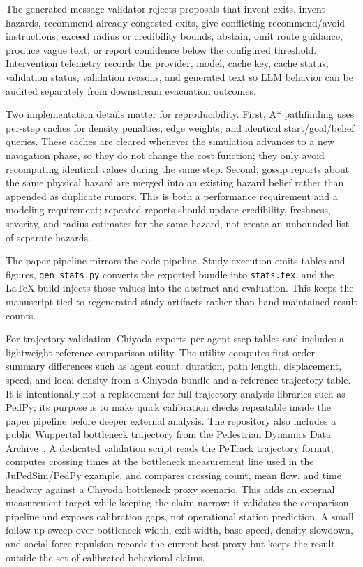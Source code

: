 The generated-message validator rejects proposals that invent exits, invent
hazards, recommend already congested exits, give conflicting recommend/avoid
instructions, exceed radius or credibility bounds, abstain, omit route
guidance, produce vague text, or report confidence below the configured
threshold. Intervention telemetry records the provider, model, cache key,
cache status, validation status, validation reasons, and generated text so
LLM behavior can be audited separately from downstream evacuation outcomes.

Two implementation details matter for reproducibility. First, A* pathfinding
uses per-step caches for density penalties, edge weights, and identical
start/goal/belief queries. These caches are cleared whenever the simulation
advances to a new navigation phase, so they do not change the cost function;
they only avoid recomputing identical values during the same step. Second,
gossip reports about the same physical hazard are merged into an existing
hazard belief rather than appended as duplicate rumors. This is both a
performance requirement and a modeling requirement: repeated reports should
update credibility, freshness, severity, and radius estimates for the same
hazard, not create an unbounded list of separate hazards.

The paper pipeline mirrors the code pipeline. Study execution emits tables and
figures, \texttt{gen\_stats.py} converts the exported bundle into
\texttt{stats.tex}, and the LaTeX build injects those values into the
abstract and evaluation. This keeps the manuscript tied to regenerated study
artifacts rather than hand-maintained result counts.

For trajectory validation, Chiyoda exports per-agent step tables and includes a
lightweight reference-comparison utility. The utility computes first-order
summary differences such as agent count, duration, path length, displacement,
speed, and local density from a Chiyoda bundle and a reference trajectory
table. It is intentionally not a replacement for full trajectory-analysis
libraries such as PedPy; its purpose is to make quick calibration checks
repeatable inside the paper pipeline before deeper external analysis.
The repository also includes a public Wuppertal bottleneck trajectory from the
Pedestrian Dynamics Data Archive~\cite{boltes2020dataarchive}. A dedicated
validation script reads the PeTrack trajectory format, computes crossing times
at the bottleneck measurement line used in the JuPedSim/PedPy example, and
compares crossing count, mean flow, and time headway against a Chiyoda
bottleneck proxy scenario. This adds an external measurement target while
keeping the claim narrow: it validates the comparison pipeline and exposes
calibration gaps, not operational station prediction. A small follow-up sweep
over bottleneck width, exit width, base speed, density slowdown, and
social-force repulsion records the current best proxy but keeps the result
outside the set of calibrated behavioral claims.
